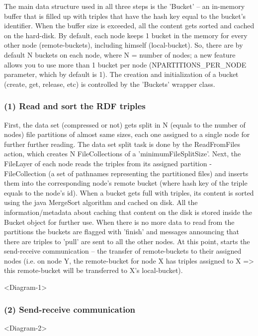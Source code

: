 The main data structure used in all three steps is the 'Bucket' -- an in-memory buffer that is filled up with triples that have the hash key equal to the bucket's identifier. When the buffer size is exceeded, all the content gets sorted and cached on the hard-disk. By default, each node keeps 1 bucket in the memory for every other node (remote-buckets), including himself (local-bucket). So, there are by default N buckets on each node, where N = number of nodes; a new feature allows you to use more than 1 bucket per node (NPARTITIONS\_PER\_NODE parameter, which by default is 1). The creation and initialization of a bucket (create, get, release, etc) is controlled by the 'Buckets' wrapper class.

% 
\subsubsection*{(1) Read and sort the RDF triples}

First, the data set (compressed or not) gets split in N (equals to the number of nodes) file partitions of almost same sizes, each one assigned to a single node for further further reading. The data set split task is done by the ReadFromFiles action, which creates N FileCollections of a 'minimumFileSplitSize'. Next, the FileLayer of each node reads the triples from its assigned partition - FileCollection (a set of pathnames representing the partitioned files) and inserts them into the corresponding node's remote bucket (where hash key of the triple equals to the node's id). When a bucket gets full with triples, its content is sorted using the java MergeSort algorithm and cached on disk. All the information/metadata about caching that content on the disk is stored inside the Bucket object for further use. When there is no more data to read from the partitions the buckets are flagged with 'finish' and messages announcing that there are triples to 'pull' are sent to all the other nodes. At this point, starts the send-receive communication -- the transfer of remote-buckets to their assigned nodes (i.e. on node Y, the remote-bucket for node X has triples assigned to X => this remote-bucket will be transferred to X's local-bucket).

<Diagram-1>

% 
\subsubsection*{(2) Send-receive communication}

<Diagram-2>


